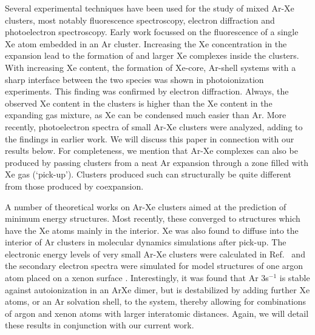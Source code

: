 Several experimental techniques have been used for the study of mixed Ar-Xe clusters, most notably fluorescence spectroscopy, electron diffraction and photoelectron spectroscopy. 
Early work focussed on the fluorescence of a single Xe atom 
embedded in an Ar cluster.\cite{lengenprl}
Increasing the Xe concentration in the expansion lead to the formation of  and larger Xe complexes inside the clusters.\cite{lengen} 
With increasing Xe content, the formation of Xe-core, Ar-shell systems with a sharp interface between the two species was shown in photoionization experiments.\cite{tchaplyguine,hoener}
This finding was confirmed by electron diffraction.\cite{Danylchenko,Danylchenko07} 
Always, the observed Xe content in the clusters is higher than the Xe content in the expanding gas mixture, as Xe can be condensed much easier than Ar.\cite{hoener,Danylchenko07}
%
More recently, photoelectron spectra of 
small Ar-Xe clusters were analyzed, adding to the findings in 
earlier work.\cite{lindblad} We will discuss this paper in 
connection with our results below. 
For completeness, we mention that Ar-Xe complexes can also be produced by passing clusters from a neat Ar expansion through a zone filled with Xe gas (`pick-up').\cite{pietrowski}
Clusters produced such can structurally be quite different from those produced by coexpansion.\cite{lindbladpccp}

A number of theoretical works on Ar-Xe clusters aimed at the prediction of minimum energy structures. 
Most recently, these converged to structures which have the Xe atoms mainly in the interior.\cite{marques} 
Xe was also found to diffuse into the interior of Ar clusters in molecular dynamics simulations after pick-up.\cite{Vach_1999} 
The electronic energy levels of very small Ar-Xe clusters were calculated in Ref.~  and the secondary electron spectra were simulated for
model structures of one argon atom placed on a xenon surface \cite{Fasshauer13}.
Interestingly, it was found that Ar 3s$^{-1}$ is stable 
against autoionization in an ArXe dimer, but is destabilized by 
adding further Xe atoms, or an Ar solvation shell, to the system, thereby allowing
for combinations of argon and xenon atoms with larger interatomic distances. 
Again, we will detail these results in conjunction with our 
current work.

